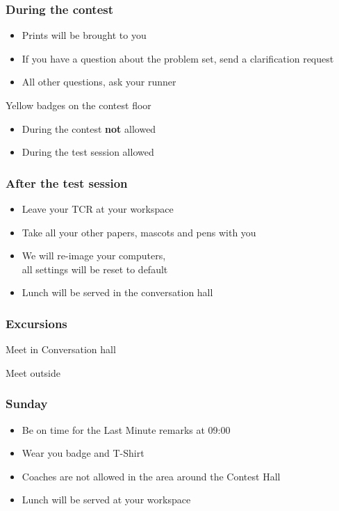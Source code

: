 \documentclass[t]{beamer}
\begin{document}
\begin{frame}
	\frametitle{During the contest}
	\begin{itemize}
		\item Prints will be brought to you 
		\item If you have a question about the problem set, send a clarification request
		\item All other questions, ask your runner
	\end{itemize}
	\begin{block}
		{Yellow badges on the contest floor}
		\begin{itemize}
			\item During the contest \textbf{not} allowed
			\item During the test session allowed
		\end{itemize}
	\end{block}
\end{frame}
\begin{frame}
	\frametitle{After the test session}
	\begin{itemize}
	\item Leave your TCR at your workspace
	\item Take all your other papers, mascots and pens with you
	\item We will re-image your computers,\\ all settings will be reset to default 
	\item Lunch will be served in the conversation hall 
	\end{itemize}
\end{frame}
\begin{frame}
	\frametitle{Excursions}
	\begin{description}[l]
		\item[Beertasting] Meet in Conversation hall
		\item[Guided City Tour] Meet outside 
	\end{description}
\end{frame}
\begin{frame}
	\frametitle{Sunday}
	\begin{itemize}
	\item Be on time for the Last Minute remarks at 09:00
	\item Wear you badge and T-Shirt
	\item Coaches are not allowed in the area around the Contest Hall 
	\item Lunch will be served at your workspace
	\end{itemize}
\end{frame}
\end{document}
